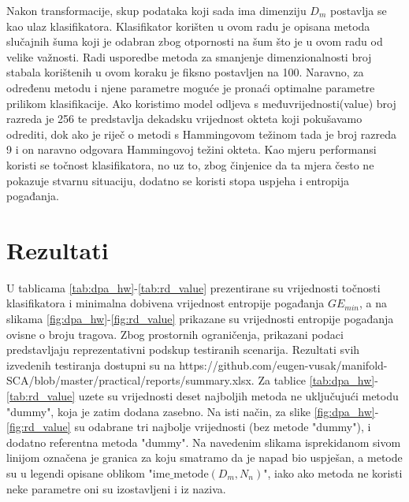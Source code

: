 \documentclass[times, utf8, diplomski]{fer}
\begin{document}
Nakon transformacije, skup podataka koji sada ima dimenziju $D_m$ postavlja se kao ulaz klasifikatora. Klasifikator korišten u ovom radu je opisana metoda slučajnih šuma koji je odabran zbog otpornosti na šum što je u ovom radu od velike važnosti. Radi usporedbe metoda za smanjenje dimenzionalnosti broj stabala korištenih u ovom koraku je fiksno postavljen na 100. Naravno, za određenu metodu i njene parametre moguće je pronaći optimalne parametre prilikom klasifikacije. Ako koristimo model odljeva s međuvrijednosti(value) broj razreda je 256 te predstavlja dekadsku vrijednost okteta koji pokušavamo odrediti, dok ako je riječ o metodi s Hammingovom težinom tada je broj razreda 9 i on naravno odgovara Hammingovoj težini okteta. Kao mjeru performansi koristi se točnost klasifikatora, no uz to, zbog činjenice da ta mjera često ne pokazuje stvarnu situaciju, dodatno se koristi stopa uspjeha  i entropija pogađanja.

\section{Rezultati}

U tablicama \ref{tab:dpa_hw}-\ref{tab:rd_value} prezentirane su vrijednosti točnosti klasifikatora i minimalna dobivena vrijednost entropije pogađanja $GE_{min}$, a na slikama \ref{fig:dpa_hw}-\ref{fig:rd_value} prikazane su vrijednosti entropije pogađanja ovisne o broju tragova. Zbog prostornih ograničenja, prikazani podaci predstavljaju reprezentativni podskup testiranih scenarija. Rezultati svih izvedenih testiranja dostupni su na https://github.com/eugen-vusak/manifold-SCA/blob/master/practical/reports/summary.xlsx. Za tablice \ref{tab:dpa_hw}-\ref{tab:rd_value} uzete su vrijednosti deset najboljih metoda ne uključujući metodu "dummy", koja je zatim dodana zasebno. Na isti način, za slike \ref{fig:dpa_hw}-\ref{fig:rd_value} su odabrane tri najbolje vrijednosti (bez  metode "dummy"), i dodatno referentna metoda "dummy". Na navedenim slikama isprekidanom sivom linijom označena je granica za koju smatramo da je napad bio uspješan, a metode su u legendi opisane oblikom "$\text{ime\_metode}(D_m, N_n)$", iako ako metoda ne koristi neke parametre oni su izostavljeni i iz naziva.
\end{document}
